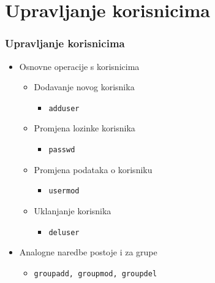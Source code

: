 \documentclass[table,usenames,dvipsnames] {beamer}
\newcommand{\shell}[1]{\texttt{#1}}
\begin{document}
\section{Upravljanje korisnicima}
\begin{frame}[t]
\frametitle{Upravljanje korisnicima}
\begin{itemize}
  \item Osnovne operacije s korisnicima
  \begin{itemize}
    \item Dodavanje novog korisnika
    \begin{itemize}
      \item[] \shell{adduser}
    \end{itemize}
    \item Promjena lozinke korisnika
    \begin{itemize}
      \item[] \shell{passwd}
    \end{itemize}
    \item Promjena podataka o korisniku
    \begin{itemize}
      \item[] \shell{usermod}
    \end{itemize}
    \item Uklanjanje korisnika
    \begin{itemize}
      \item[] \shell{deluser}
    \end{itemize}
  \end{itemize}
\end{itemize}
\begin{itemize}
	\item Analogne naredbe postoje i za grupe
	\begin{itemize}
		\item[] \shell{groupadd, groupmod, groupdel}
	\end{itemize}
\end{itemize}
\end{frame}
\end{document}

